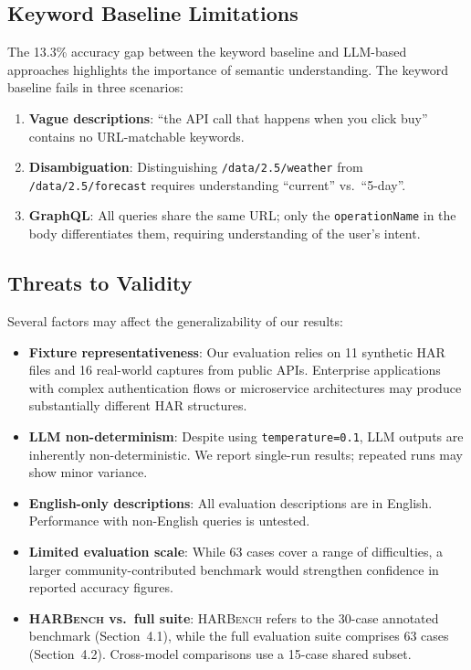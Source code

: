 \documentclass[10pt,twocolumn]{article}
\begin{document}
\subsection{Keyword Baseline Limitations}

The 13.3\% accuracy gap between the keyword baseline and LLM-based approaches highlights the importance of semantic understanding. The keyword baseline fails in three scenarios:
\begin{enumerate}[nosep]
  \item \textbf{Vague descriptions}: ``the API call that happens when you click buy'' contains no URL-matchable keywords.
  \item \textbf{Disambiguation}: Distinguishing \texttt{/data/2.5/weather} from \texttt{/data/2.5/forecast} requires understanding ``current'' vs.\ ``5-day''.
  \item \textbf{GraphQL}: All queries share the same URL; only the \texttt{operationName} in the body differentiates them, requiring understanding of the user's intent.
\end{enumerate}

\subsection{Threats to Validity}

Several factors may affect the generalizability of our results:

\begin{itemize}[nosep]
  \item \textbf{Fixture representativeness}: Our evaluation relies on 11 synthetic HAR files and 16 real-world captures from public APIs. Enterprise applications with complex authentication flows or microservice architectures may produce substantially different HAR structures.
  \item \textbf{LLM non-determinism}: Despite using \texttt{temperature=0.1}, LLM outputs are inherently non-deterministic. We report single-run results; repeated runs may show minor variance.
  \item \textbf{English-only descriptions}: All evaluation descriptions are in English. Performance with non-English queries is untested.
  \item \textbf{Limited evaluation scale}: While 63 cases cover a range of difficulties, a larger community-contributed benchmark would strengthen confidence in reported accuracy figures.
  \item \textbf{\textsc{HARBench} vs.\ full suite}: \textsc{HARBench} refers to the 30-case annotated benchmark (Section~4.1), while the full evaluation suite comprises 63 cases (Section~4.2). Cross-model comparisons use a 15-case shared subset.
\end{itemize}
\end{document}
